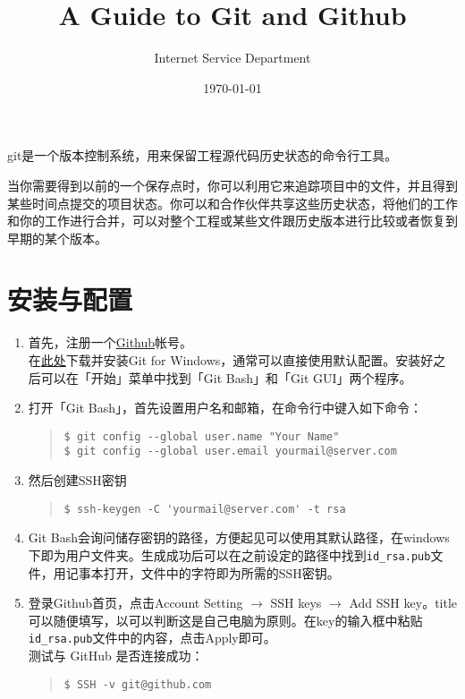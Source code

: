 \documentclass{article}
\title{A Guide to Git and Github}
\author{Internet Service Department}
\date{\today}
\begin{document}
	\maketitle
	\tableofcontents
	\newpage
	git是一个版本控制系统，用来保留工程源代码历史状态的命令行工具。
	\par 当你需要得到以前的一个保存点时，你可以利用它来追踪项目中的文件，并且得到某些时间点提交的项目状态。你可以和合作伙伴共享这些历史状态，将他们的工作和你的工作进行合并，可以对整个工程或某些文件跟历史版本进行比较或者恢复到早期的某个版本。
	\section{安装与配置} %
	\label{sec:安装与配置}
		\begin{enumerate}
			\item 首先，注册一个\href{http://github.com/}{Github}帐号。
			\\在\href{http://msysgit.github.io/}{此处}下载并安装Git for Windows，通常可以直接使用默认配置。安装好之后可以在「开始」菜单中找到「Git Bash」和「Git GUI」两个程序。
			\item 打开「Git Bash」，首先设置用户名和邮箱，在命令行中键入如下命令：
			\begin{quote}
				\begin{lstlisting}
$ git config --global user.name "Your Name"
$ git config --global user.email yourmail@server.com
				\end{lstlisting}
			\end{quote}
			\item 然后创建SSH密钥
			\begin{quote}
				\begin{lstlisting}
$ ssh-keygen -C 'yourmail@server.com' -t rsa
				\end{lstlisting}
			\end{quote}
			\item Git Bash会询问储存密钥的路径，方便起见可以使用其默认路径，在windows下即为用户文件夹。生成成功后可以在之前设定的路径中找到{\tt id\_rsa.pub}文件，用记事本打开，文件中的字符即为所需的SSH密钥。
			\item 登录Github首页，点击Account Setting $\to$ SSH keys $\to$ Add SSH key。title可以随便填写，以可以判断这是自己电脑为原则。在key的输入框中粘贴{\tt id\_rsa.pub}文件中的内容，点击Apply即可。
			\\测试与 GitHub 是否连接成功：
			\begin{quote}
				\begin{lstlisting}
$ SSH -v git@github.com

\end{lstlisting}
\end{quote}
\end{enumerate}
\end{document}
